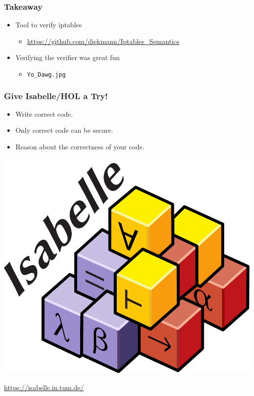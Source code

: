 \documentclass[aspectratio=169,t]{beamer}
\begin{document}
\begin{frame}
	\frametitle{Takeaway}
	\vspace*{5ex}
	\begin{itemize}
		\itemsep2ex
		\item Tool to verify iptables
		\begin{itemize}
			\item \url{https://github.com/diekmann/Iptables_Semantics}
		\end{itemize}
 		\item<2-> Verifying the verifier was great fun
 		\begin{itemize}
			\item \texttt{Yo\_Dawg.jpg}
		\end{itemize}
	\end{itemize}
\end{frame}

\begin{frame}
	\frametitle{Give Isabelle/HOL a Try!}
	\vspace*{5ex}
	\begin{itemize}
		\item Write correct code.
		\item Only correct code can be secure.
		\item Reason about the correctness of your code.
	\end{itemize}
	\medskip
	\begin{center}
		\includegraphics[scale=.2]{isabelle.pdf}
	\end{center}
	\url{https://isabelle.in.tum.de/}
\end{frame}
\end{document}
